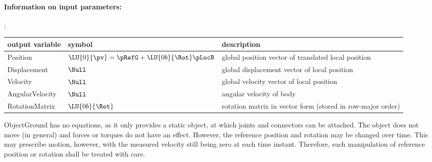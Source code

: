 \paragraph{Information on input parameters:} 
\finishTable

:
\begin{center}
\footnotesize
\begin{longtable}{| p{5cm} | p{5cm} | p{6cm} |} 
\hline
\bf output variable & \bf symbol & \bf description \\ \hline
Position & $\LU{0}{\pv} = \pRefG + \LU{0b}{\Rot} \pLocB$ & global position vector of translated local position\\ \hline
Displacement & $\Null$ & global displacement vector of local position\\ \hline
Velocity & $\Null$ & global velocity vector of local position\\ \hline
AngularVelocity & $\Null$ & angular velocity of body\\ \hline
RotationMatrix & $\LU{0b}{\Rot}$ & rotation matrix in vector form (stored in row-major order)\\ \hline
\end{longtable}
\end{center}
 \noindent
    ObjectGround has no equations, as it only provides a static object, at which joints and connectors can be attached. 
    The object does not move (in general) and forces or torques do not have an effect.
    However, the reference position and rotation may be changed over time. This may prescribe
    motion, however, with the measured velocity still being zero at each time instant. Therefore,
    such manipulation of reference position or rotation shall be treated with care.
    
